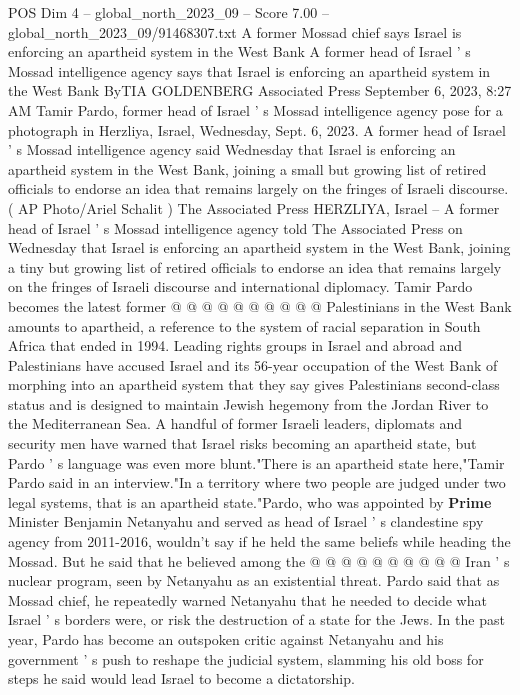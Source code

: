 \begin{textsample}{POS Dim 4 – global\_north\_2023\_09 – Score 7.00 – global\_north\_2023\_09/91468307.txt}  \label{ex:f4_pos_413}
A former Mossad chief says Israel is enforcing an apartheid system in the West Bank A former head of Israel ' s Mossad intelligence agency says that Israel is enforcing an apartheid system in the West Bank ByTIA GOLDENBERG Associated Press September 6, 2023, 8:27 AM Tamir Pardo, former head of Israel ' s Mossad intelligence agency pose for a photograph in Herzliya, Israel, Wednesday, Sept. 6, 2023.
A former head of Israel ' s Mossad intelligence agency said Wednesday that Israel is enforcing an apartheid system in the West Bank, joining a small but growing list of retired officials to endorse an idea that remains largely on the fringes of Israeli discourse. ( AP Photo/Ariel Schalit ) The Associated Press HERZLIYA, Israel -- A former head of Israel ' s Mossad intelligence agency told The Associated Press on Wednesday that Israel is enforcing an apartheid system in the West Bank, joining a tiny but growing list of retired officials to endorse an idea that remains largely on the fringes of Israeli discourse and international diplomacy.
Tamir Pardo becomes the latest former @ @ @ @ @ @ @ @ @ @ Palestinians in the West Bank amounts to apartheid, a reference to the system of racial separation in South Africa that ended in 1994.
Leading rights groups in Israel and abroad and Palestinians have accused Israel and its 56-year occupation of the West Bank of morphing into an apartheid system that they say gives Palestinians second-class status and is designed to maintain Jewish hegemony from the Jordan River to the Mediterranean Sea.
A handful of former Israeli leaders, diplomats and security men have warned that Israel risks becoming an apartheid state, but Pardo ' s language was even more blunt."There is an apartheid state here,"Tamir Pardo said in an interview."In a territory where two people are judged under two legal systems, that is an apartheid state."Pardo, who was appointed by \textbf{Prime} Minister Benjamin Netanyahu and served as head of Israel ' s clandestine spy agency from 2011-2016, wouldn't say if he held the same beliefs while heading the Mossad.
But he said that he believed among the @ @ @ @ @ @ @ @ @ @ Iran ' s nuclear program, seen by Netanyahu as an existential threat.
Pardo said that as Mossad chief, he repeatedly warned Netanyahu that he needed to decide what Israel ' s borders were, or risk the destruction of a state for the Jews.
In the past year, Pardo has become an outspoken critic against Netanyahu and his government ' s push to reshape the judicial system, slamming his old boss for steps he said would lead Israel to become a dictatorship.

\end{textsample}
